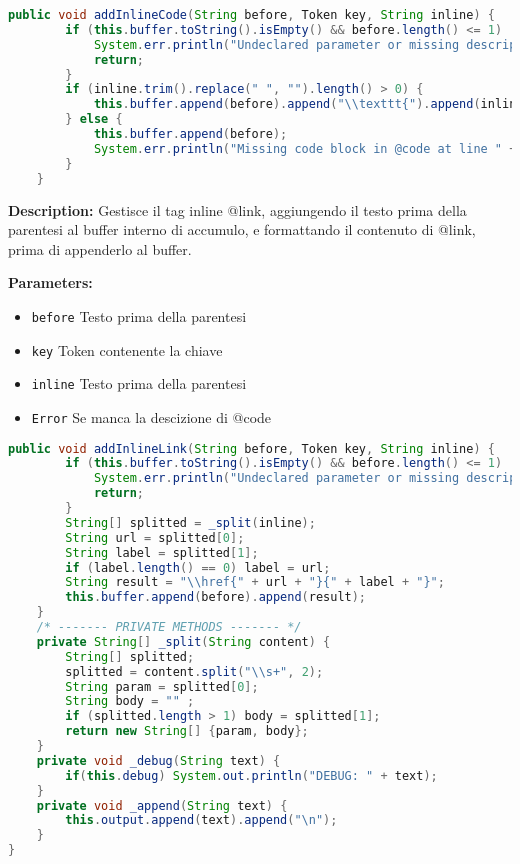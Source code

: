 \documentclass{article}
\makeatletter
\newcommand\atsign{@}
\makeatother
\begin{document}
\begin{lstlisting}[language=Java]
    public void addInlineCode(String before, Token key, String inline) {
        if (this.buffer.toString().isEmpty() && before.length() <= 1)  {
            System.err.println("Undeclared parameter or missing description at line " + key.getLine() + " before the inline code.");
            return;
        }
        if (inline.trim().replace(" ", "").length() > 0) {
            this.buffer.append(before).append("\\texttt{").append(inline).append("}");
        } else {
            this.buffer.append(before);
            System.err.println("Missing code block in @code at line " + key.getLine());
        }
    }
\end{lstlisting}
\textbf{Description:}  Gestisce il tag inline \atsign link, aggiungendo il testo prima della parentesi al buffer interno di accumulo, e formattando il contenuto di \atsign link, prima di appenderlo al buffer.  

\textbf{Parameters:}
\begin{itemize}
  \item\texttt{before} Testo prima della parentesi 
  \item\texttt{key} Token contenente la chiave 
  \item\texttt{inline} Testo prima della parentesi  
  \item\texttt{Error} Se manca la descizione di \atsign code
\end{itemize}

\begin{lstlisting}[language=Java]
    public void addInlineLink(String before, Token key, String inline) {
        if (this.buffer.toString().isEmpty() && before.length() <= 1)  {
            System.err.println("Undeclared parameter or missing description at line " + key.getLine() + " before the inline link.");
            return;
        }
        String[] splitted = _split(inline);
        String url = splitted[0];
        String label = splitted[1];
        if (label.length() == 0) label = url;
        String result = "\\href{" + url + "}{" + label + "}";
        this.buffer.append(before).append(result);
    }
    /* ------- PRIVATE METHODS ------- */
    private String[] _split(String content) {
        String[] splitted;
        splitted = content.split("\\s+", 2);
        String param = splitted[0];
        String body = "" ;
        if (splitted.length > 1) body = splitted[1];
        return new String[] {param, body};
    }
    private void _debug(String text) {
        if(this.debug) System.out.println("DEBUG: " + text);
    }
    private void _append(String text) {
        this.output.append(text).append("\n");
    }
}
\end{lstlisting}
\end{document}
